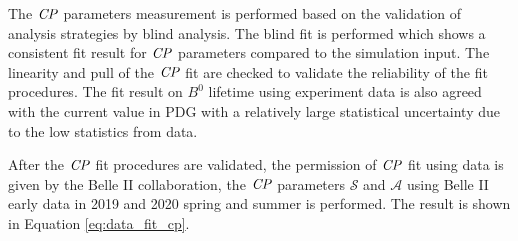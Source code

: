  
\begin{comment}
Furthermore, the key to improve the precision of this measurement highly depends on the better signal reconstruction efficiency and vertex fitting. Both of these performances have been primarily studied to be either same competitive or outperformed with current Belle II condition compared to Belle. $K_S^0$ finder which guarantees the signal efficiency in the key role can be optimized by taking a better correction from data MC comparison in future. Besides, other algorithm such as deep neural network (DNN) may give a better discrimination but haven't been studied yet. One of the major concern is that tracking efficiency of $K_S^0$ is degraded by their long flight length, and it damages the advantage of having a larger detector volume in Belle II design motives. The expected boost in $K_S^0$ reconstruction is about 15\% which yields nearly 50\% more $B^0$ in this channel. Due to this issue, even with improved reconstruction strategies, the efficiency is not largely boosted as expected. This degradation may become even worse when higher background level is induced in future operation, the related improvement both from hardware and software is under construction. Thanks to extra PXD layers in Belle II, decay vertex now have a better constraint and smaller uncertainties. The resolution studies on \textit{CP} and tag side shows a clear improvement on vertexing accuracy. The vertex reconstruction still has a margin to improve after the full installation of PXD layer 2. The modeling of resolution function should also evolve with better understanding of vertexing performance along with data collection. The analysis presented in this thesis, including various strategies and supporting studies, paves a solid way for the time-dependent \textit{CP} violation measurement with Belle II data in the next few years. 
\end{comment}

The $\it{CP}$ parameters measurement is performed based on the validation of analysis strategies by blind analysis.  
The blind fit is performed which shows a consistent fit result for $\it{CP}$ parameters compared to the simulation input. The linearity and pull of the $\it{CP}$ fit are checked to validate the reliability of the fit procedures. The fit result on $B^0$ lifetime using experiment data is also agreed with the current value in PDG with a relatively large statistical uncertainty due to the low statistics from data.

After the $\it{CP}$ fit procedures are validated, the permission of $\it{CP}$ fit using data is given by the Belle II collaboration, the $\it{CP}$ parameters $\mathcal{S}$ and $\mathcal{A}$ using Belle II early data in 2019 and 2020 spring and summer is performed. The result is shown in Equation \ref{eq:data_fit_cp}.

